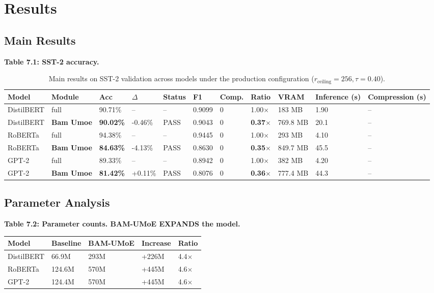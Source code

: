 \section{Results}

\subsection{Main Results}

\textbf{Table 7.1: SST-2 accuracy.}

\begin{table}[t]
\centering
\small
\begin{tabular}{lllllllllll}
\toprule
\textbf{Model} & \textbf{Module} & \textbf{Acc} & \textbf{$\Delta$} & \textbf{Status} & \textbf{F1} & \textbf{Comp.} & \textbf{Ratio} & \textbf{VRAM} & \textbf{Inference (s)} & \textbf{Compression (s)} \\
\midrule
DistilBERT & full & 90.71\% & -- & -- & 0.9099 & 0 & 1.00$\times$ & 183 MB & 1.90 & -- \\
DistilBERT & \textbf{Bam Umoe} & \textbf{90.02\%} & -0.46\% & PASS & 0.9043 & 0 & \textbf{0.37$\times$} & 769.8 MB & 20.1 & -- \\
RoBERTa & full & 94.38\% & -- & -- & 0.9445 & 0 & 1.00$\times$ & 293 MB & 4.10 & -- \\
RoBERTa & \textbf{Bam Umoe} & \textbf{84.63\%} & -4.13\% & PASS & 0.8630 & 0 & \textbf{0.35$\times$} & 849.7 MB & 45.5 & -- \\
GPT-2 & full & 89.33\% & -- & -- & 0.8942 & 0 & 1.00$\times$ & 382 MB & 4.20 & -- \\
GPT-2 & \textbf{Bam Umoe} & \textbf{81.42\%} & +0.11\% & PASS & 0.8076 & 0 & \textbf{0.36$\times$} & 777.4 MB & 44.3 & -- \\
\bottomrule
\end{tabular}
\caption{Main results on SST-2 validation across models under the production configuration ($r_{\mathrm{ceiling}}=256, \tau=0.40$).}
\label{tab:main_sst2}
\end{table}

\subsection{Parameter Analysis}

\textbf{Table 7.2: Parameter counts. BAM-UMoE EXPANDS the model.}

\begin{table}[H]
\centering
\small
\begin{tabular}{lllll}
\toprule
\textbf{Model} & \textbf{Baseline} & \textbf{BAM-UMoE} & \textbf{Increase} & \textbf{Ratio} \\
\midrule
DistilBERT & 66.9M & 293M & +226M & 4.4$\times$ \\
RoBERTa & 124.6M & 570M & +445M & 4.6$\times$ \\
GPT-2 & 124.4M & 570M & +445M & 4.6$\times$ \\
\bottomrule
\end{tabular}
\end{table}


